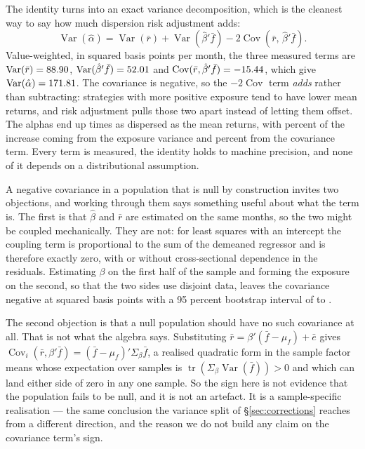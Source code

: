 \documentclass{article}
\begin{document}
The identity turns into an exact variance decomposition, which is the cleanest
way to say how much dispersion risk adjustment adds:
\begin{equation}
\label{eq:decomp}
\operatorname{Var}(\hat\alpha)
  = \operatorname{Var}(\bar r)
  + \operatorname{Var}(\hat\beta'\bar f)
  - 2\operatorname{Cov}(\bar r,\, \hat\beta'\bar f).
\end{equation}
Value-weighted, in squared basis points per month, the three measured terms are
$\operatorname{Var}(\bar r) = 88.90$,
$\operatorname{Var}(\hat\beta'\bar f) = 52.01$ and
$\operatorname{Cov}(\bar r, \hat\beta'\bar f) = -15.44$, which give
$\operatorname{Var}(\hat\alpha) = 171.81$. The covariance is
negative, so the $-2\operatorname{Cov}$ term \emph{adds}
\bzooamVarCovTermVw{} rather than subtracting: strategies with more positive
exposure tend to have lower mean returns, and risk adjustment pulls those two
apart instead of letting them offset. The alphas end up \bzooamSdRatioVw{} times
as dispersed as the mean returns, with \bzooamIncreaseExposurePct{} percent of
the increase coming from the exposure variance and
\bzooamIncreaseCovPct{} percent from the covariance term. Every term is
measured, the identity holds to machine precision, and none of it depends on a
distributional assumption.

A negative covariance in a population that is null by construction invites two
objections, and working through them says something useful about what the term
is. The first is that $\hat\beta$ and $\bar r$ are estimated on the same
months, so the two might be coupled mechanically. They are not: for least
squares with an intercept the coupling term is proportional to the sum of the
demeaned regressor and is therefore exactly zero, with or without
cross-sectional dependence in the residuals. Estimating $\beta$ on the first
half of the sample and forming the exposure on the second, so that the two
sides use disjoint data, leaves the covariance negative at \bzooamCovOosBps{}
squared basis points with a 95 percent bootstrap interval of
\bzooamCovOosLoBps{} to \bzooamCovOosHiBps{}.

The second objection is that a null population should have no such covariance
at all. That is not what the algebra says. Substituting
$\bar r = \beta'(\bar f - \mu_f) + \bar e$ gives
$\operatorname{Cov}_i(\bar r, \beta'\bar f) =
(\bar f - \mu_f)' \Sigma_\beta \bar f$, a realised quadratic form in the sample
factor means whose expectation over samples is
$\operatorname{tr}(\Sigma_\beta \operatorname{Var}(\bar f)) > 0$ and which can
land either side of zero in any one sample. So the sign here is not evidence
that the population fails to be null, and it is not an artefact. It is a
sample-specific realisation --- the same conclusion the variance split of
\S\ref{sec:corrections} reaches from a different direction, and the reason we
do not build any claim on the covariance term's sign.
\end{document}
